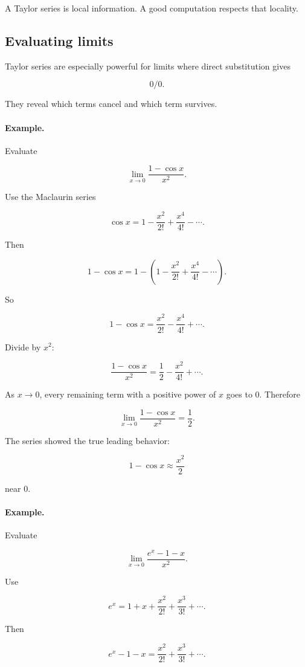 A Taylor series is local information.  A good computation respects that locality.

\subsection{Evaluating limits}
\label{subsec:evaluating-limits-taylor}

Taylor series are especially powerful for limits where direct substitution gives

\[
0/0.
\]

They reveal which terms cancel and which term survives.

\paragraph{Example.}
Evaluate

\[
\lim_{x\to0}\frac{1-\cos x}{x^2}.
\]

Use the Maclaurin series

\[
\cos x=
1-\frac{x^2}{2!}+\frac{x^4}{4!}-\cdots.
\]

Then

\[
1-\cos x
=
1-\left(1-\frac{x^2}{2!}+\frac{x^4}{4!}-\cdots\right).
\]

So

\[
1-\cos x
=
\frac{x^2}{2!}-\frac{x^4}{4!}+\cdots.
\]

Divide by \(x^2\):

\[
\frac{1-\cos x}{x^2}
=
\frac12-\frac{x^2}{4!}+\cdots.
\]

As \(x\to0\), every remaining term with a positive power of \(x\) goes to \(0\).  Therefore

\[
\boxed{
\lim_{x\to0}\frac{1-\cos x}{x^2}=\frac12.
}
\]

The series showed the true leading behavior:

\[
1-\cos x\approx \frac{x^2}{2}
\]

near \(0\).

\paragraph{Example.}
Evaluate

\[
\lim_{x\to0}\frac{e^x-1-x}{x^2}.
\]

Use

\[
e^x=
1+x+\frac{x^2}{2!}+\frac{x^3}{3!}+\cdots.
\]

Then

\[
e^x-1-x
=
\frac{x^2}{2!}+\frac{x^3}{3!}+\cdots.
\]

